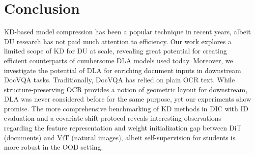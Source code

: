 \documentclass[runningheads]{llncs}
\begin{document}
\section{Conclusion}
KD-based model compression has been a popular technique in recent years, albeit DU research has not paid much attention to efficiency.
Our work explores a limited scope of KD for DU at scale, revealing great potential for creating efficient counterparts of cumbersome DLA models used today.
Moreover, we investigate the potential of DLA for enriching document inputs in downstream DocVQA tasks.
Traditionally, DocVQA has relied on plain OCR text. While structure-preserving OCR provides a notion of geometric layout for downstream, DLA was never considered before for the same purpose, yet our experiments show promise.
The more comprehensive benchmarking of KD methods in DIC with ID evaluation and a covariate shift protocol reveals interesting observations regarding the feature representation and weight initialization gap between DiT (documents) and ViT (natural images), albeit self-supervision for students is more robust in the OOD setting.



\end{document}
